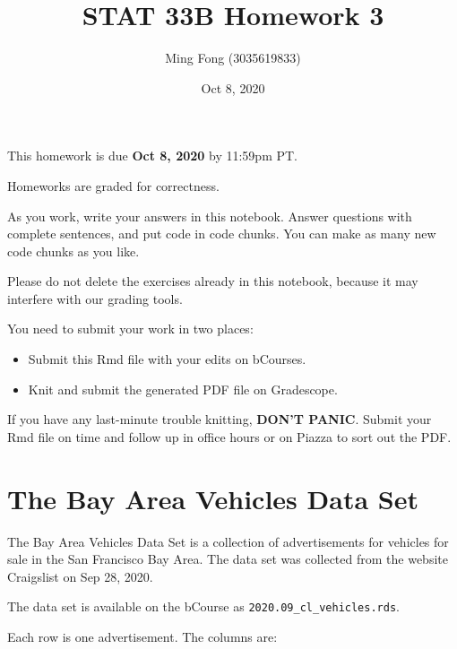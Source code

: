 \documentclass[
]{article}
\title{STAT 33B Homework 3}
\author{Ming Fong (3035619833)}
\date{Oct 8, 2020}
\providecommand{\tightlist}{%
  \setlength{\itemsep}{0pt}\setlength{\parskip}{0pt}}
\begin{document}
\maketitle

This homework is due \textbf{Oct 8, 2020} by 11:59pm PT.

Homeworks are graded for correctness.

As you work, write your answers in this notebook. Answer questions with
complete sentences, and put code in code chunks. You can make as many
new code chunks as you like.

Please do not delete the exercises already in this notebook, because it
may interfere with our grading tools.

You need to submit your work in two places:

\begin{itemize}
\tightlist
\item
  Submit this Rmd file with your edits on bCourses.
\item
  Knit and submit the generated PDF file on Gradescope.
\end{itemize}

If you have any last-minute trouble knitting, \textbf{DON'T PANIC}.
Submit your Rmd file on time and follow up in office hours or on Piazza
to sort out the PDF.

\hypertarget{the-bay-area-vehicles-data-set}{%
\section{The Bay Area Vehicles Data
Set}\label{the-bay-area-vehicles-data-set}}

The Bay Area Vehicles Data Set is a collection of advertisements for
vehicles for sale in the San Francisco Bay Area. The data set was
collected from the website Craigslist on Sep 28, 2020.

The data set is available on the bCourse as
\texttt{2020.09\_cl\_vehicles.rds}.

Each row is one advertisement. The columns are:
\end{document}
